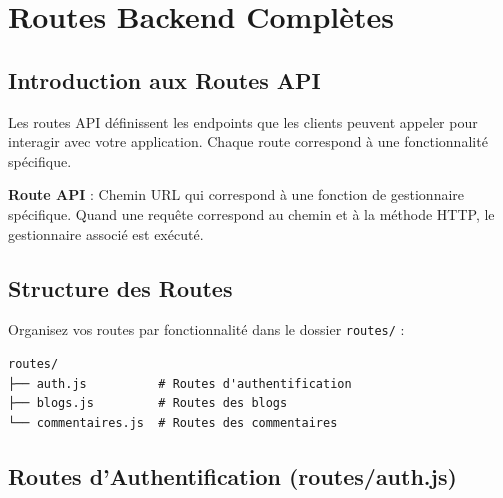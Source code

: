 \chapter{Routes Backend Complètes}

\section{Introduction aux Routes API}

Les routes API définissent les endpoints que les clients peuvent appeler pour interagir avec votre application. Chaque route correspond à une fonctionnalité spécifique.

\begin{definitionbox}
    \textbf{Route API} : Chemin URL qui correspond à une fonction de gestionnaire spécifique. Quand une requête correspond au chemin et à la méthode HTTP, le gestionnaire associé est exécuté.
\end{definitionbox}

\section{Structure des Routes}

Organisez vos routes par fonctionnalité dans le dossier \texttt{routes/} :

\begin{lstlisting}[style=bash, caption=Structure du dossier routes]
routes/
├── auth.js          # Routes d'authentification
├── blogs.js         # Routes des blogs
└── commentaires.js  # Routes des commentaires
\end{lstlisting}

\section{Routes d'Authentification (routes/auth.js)}

